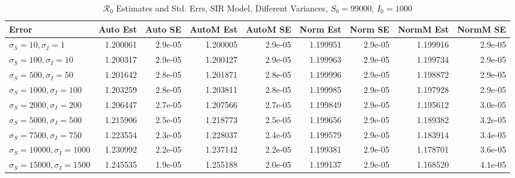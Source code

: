 \documentclass[12pt]{article}
\newcommand{\rr}{\ensuremath{\mathcal{R}_0}}
\begin{document}
\begin{table}[H]
	
	\caption{$\rr$ Estimates and Std. Errs, SIR Model, 
		Different Variances, $S_0 = 99000$, $I_0 = 1000$}
	\begin{footnotesize}
		\hskip -1.7cm
	\begin{tabular}{l|r|r|r|r|r|r|r|r}
		\hline
		Error & Auto Est & Auto SE & AutoM Est & AutoM SE & Norm Est & Norm SE & NormM Est & NormM SE\\
		\hline
		$\sigma_S = 10, \sigma_I = 1$ & 1.200061 & 2.9e-05 & 1.200005 & 2.9e-05 & 1.199951 & 2.9e-05 & 1.199916 & 2.9e-05\\
		\hline
		$\sigma_S = 100, \sigma_I = 10$ & 1.200317 & 2.9e-05 & 1.200427 & 2.9e-05 & 1.199963 & 2.9e-05 & 1.199734 & 2.9e-05\\
		\hline
		$\sigma_S = 500, \sigma_I = 50$ & 1.201642 & 2.8e-05 & 1.201871 & 2.8e-05 & 1.199996 & 2.9e-05 & 1.198872 & 2.9e-05\\
		\hline
		$\sigma_S = 1000, \sigma_I = 100$ & 1.203259 & 2.8e-05 & 1.203811 & 2.8e-05 & 1.199985 & 2.9e-05 & 1.197928 & 2.9e-05\\
		\hline
		$\sigma_S = 2000, \sigma_I = 200$ & 1.206447 & 2.7e-05 & 1.207566 & 2.7e-05 & 1.199849 & 2.9e-05 & 1.195612 & 3.0e-05\\
		\hline
		$\sigma_S = 5000, \sigma_I = 500$ & 1.215906 & 2.5e-05 & 1.218773 & 2.5e-05 & 1.199656 & 2.9e-05 & 1.189382 & 3.2e-05\\
		\hline
		$\sigma_S = 7500, \sigma_I = 750$ & 1.223554 & 2.3e-05 & 1.228037 & 2.4e-05 & 1.199579 & 2.9e-05 & 1.183914 & 3.4e-05\\
		\hline
		$\sigma_S = 10000, \sigma_I = 1000$ & 1.230992 & 2.2e-05 & 1.237142 & 2.2e-05 & 1.199381 & 2.9e-05 & 1.178701 & 3.6e-05\\
		\hline
		$\sigma_S = 15000, \sigma_I = 1500$ & 1.245535 & 1.9e-05 & 1.255188 & 2.0e-05 & 1.199137 & 2.9e-05 & 1.168520 & 4.1e-05\\
		\hline
	\end{tabular}
\end{footnotesize}
\end{table}
\end{document}
